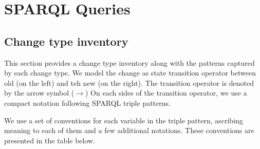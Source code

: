\section{SPARQL Queries}

\subsection{Change type inventory}
This section provides a change type inventory along with the patterns captured by each change type. We model the change as state transition operator between old (on the left) and teh new (on the right). The transition operator is denoted by the arrow symbol ($\rightarrow$) On each sides of the transition operator, we use a compact notation following SPARQL triple patterns.

We use a set of conventions for each variable in the triple pattern, ascribing meaning to each of them and a few additional notations. These conventions are presented in the table below.


